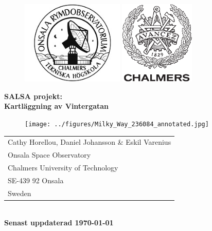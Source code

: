\begin{titlepage}

\begin{figure}[t]
\vspace{-2cm}
\centering
\includegraphics[height=4cm]{../figures/OSO-logo.jpg}
\hspace{4cm}
\includegraphics[height=4cm]{../figures/CHALMERS-logo.pdf}
\vspace{1cm}
\end{figure}

\begin{center}
\Huge \textbf{
SALSA projekt: 		\\
\bigskip
Kartläggning av Vintergatan
}
\end{center}

\begin{figure}[!h]
\centering
\texttt{[image: ../figures/Milky\_Way\_236084\_annotated.jpg]}
\end{figure}


\begin{center}
\begin{tabular}{l}
Cathy Horellou, Daniel Johansson \& Eskil Varenius\\
Onsala Space Observatory		\\
Chalmers University of Technology	\\
SE-439 92 Onsala			\\
Sweden					\\
\end{tabular}\\
\vspace{0.5cm}
\yyyymmdddate
{\bf Senast uppdaterad \today \, \currenttime}
\end{center}

\end{titlepage}

